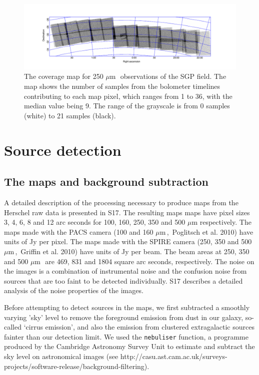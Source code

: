 \documentclass[useAMS,usenatbib]{mn2e}
\def\mic{ $\mu $m\,}
\begin{document}
\begin{figure} %
\includegraphics[scale=1.]{sgpcoverage.pdf}
\caption{ \protect\label{skymaps} 
The coverage map for 250\mic\ observations
of the SGP field.
The map shows the number of samples from the bolometer timelines contributing
to each map pixel, which ranges from 1 to 36, with the median value being 9.
The range of the grayscale is from 0 samples (white) to 21 samples
(black).}
\end{figure}

\section{Source detection} 

\subsection{The maps and background subtraction} 

A detailed description of the processing necessary
to produce maps from the
Herschel raw data is presented in S17. The resulting maps maps have
pixel sizes 3, 4, 6, 8 and 12 arc seconds for 100, 160, 250, 350 and
500 $\mu$m respectively. The maps made with the PACS camera
(100 and 160\mic,\ Poglitsch et al. 2010) have units
of Jy per pixel. The maps made with the SPIRE camera
(250, 350 and 500\mic,\ Griffin et al. 2010) have units of Jy per beam.
The beam
areas at 250, 350 and 500\mic\ are 469, 831 and 1804 square arc seconds,
respectively.
The noise on the images is a combination of instrumental noise and the
confusion noise from sources that are too faint to be detected individually.
S17 describes a detailed analysis of the noise properties of the images.

Before attempting to detect sources in the maps, we first subtracted a
smoothly varying 'sky' level to remove the 
foreground emission from dust in our galaxy, so-called `cirrus emission',
and also the emission from
clustered extragalactic sources fainter
than
our detection limit. We
used the {\tt nebuliser} function, a programme produced
by the Cambridge Astronomy Survey Unit to estimate and
subtract the sky level on astronomical images (see
http://casu.ast.cam.ac.uk/surveys-projects/software-release/background-filtering). 
\end{document}
